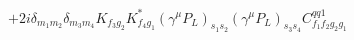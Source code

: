 %
\begin{dmath*}
%
  +  2 i\delta_{m_1 m_2} \delta_{m_3 m_4} K_{f_3 g_2} K_{f_4 g_1}^* (\gamma^{\mu} P_L)_{s_1 s_2} (\gamma^{\mu} P_L)_{s_3 s_4} C^{qq1}_{f_1 f_2 g_2 g_1}
%
\end{dmath*}
%
